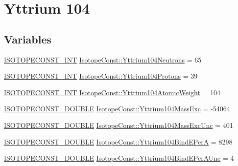 \hypertarget{group___isotope_const-_yttrium-_y104}{}\section{Yttrium 104}
\label{group___isotope_const-_yttrium-_y104}
\subsection*{Variables}
\begin{DoxyCompactItemize}
\item 
\mbox{\hyperlink{group___isotope_const-_macros_ga5f18360b3e99483a35c32d789e62621c}{I\+S\+O\+T\+O\+P\+E\+C\+O\+N\+S\+T\+\_\+\+I\+NT}} \mbox{\hyperlink{group___isotope_const-_yttrium-_y104_gafc2edc036fb6efa57680b9d480b7b89e}{Isotope\+Const\+::\+Yttrium104\+Neutrons}} = 65
\item 
\mbox{\hyperlink{group___isotope_const-_macros_ga5f18360b3e99483a35c32d789e62621c}{I\+S\+O\+T\+O\+P\+E\+C\+O\+N\+S\+T\+\_\+\+I\+NT}} \mbox{\hyperlink{group___isotope_const-_yttrium-_y104_gac8975dad077b51099c9872efe468aebc}{Isotope\+Const\+::\+Yttrium104\+Protons}} = 39
\item 
\mbox{\hyperlink{group___isotope_const-_macros_ga5f18360b3e99483a35c32d789e62621c}{I\+S\+O\+T\+O\+P\+E\+C\+O\+N\+S\+T\+\_\+\+I\+NT}} \mbox{\hyperlink{group___isotope_const-_yttrium-_y104_gabd27d6c43868d36bd6bd471f80290d2a}{Isotope\+Const\+::\+Yttrium104\+Atomic\+Weight}} = 104
\item 
\mbox{\hyperlink{group___isotope_const-_macros_ga8f45a7272ce02c0b4c65c44636ed719a}{I\+S\+O\+T\+O\+P\+E\+C\+O\+N\+S\+T\+\_\+\+D\+O\+U\+B\+LE}} \mbox{\hyperlink{group___isotope_const-_yttrium-_y104_ga355b6a18bba637f64213e09bc3a51a57}{Isotope\+Const\+::\+Yttrium104\+Mass\+Exc}} = -\/54064
\item 
\mbox{\hyperlink{group___isotope_const-_macros_ga8f45a7272ce02c0b4c65c44636ed719a}{I\+S\+O\+T\+O\+P\+E\+C\+O\+N\+S\+T\+\_\+\+D\+O\+U\+B\+LE}} \mbox{\hyperlink{group___isotope_const-_yttrium-_y104_ga56add808452e4e840f8ba36522c042ed}{Isotope\+Const\+::\+Yttrium104\+Mass\+Exc\+Unc}} = 401
\item 
\mbox{\hyperlink{group___isotope_const-_macros_ga8f45a7272ce02c0b4c65c44636ed719a}{I\+S\+O\+T\+O\+P\+E\+C\+O\+N\+S\+T\+\_\+\+D\+O\+U\+B\+LE}} \mbox{\hyperlink{group___isotope_const-_yttrium-_y104_gac9cb326791f8c4b93cf2b62024d0db2c}{Isotope\+Const\+::\+Yttrium104\+Bind\+E\+PerA}} = 8298
\item 
\mbox{\hyperlink{group___isotope_const-_macros_ga8f45a7272ce02c0b4c65c44636ed719a}{I\+S\+O\+T\+O\+P\+E\+C\+O\+N\+S\+T\+\_\+\+D\+O\+U\+B\+LE}} \mbox{\hyperlink{group___isotope_const-_yttrium-_y104_ga19ecac1baedcda6bbcce4a10cc938d3f}{Isotope\+Const\+::\+Yttrium104\+Bind\+E\+Per\+A\+Unc}} = 4

\end{DoxyCompactItemize}
